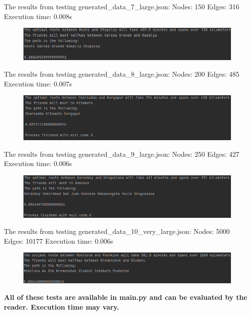 \documentclass[12pt]{article}
\begin{document}
The results from testing generated\_data\_7\_large.json:
\newline
Nodes: 150
\newline
Edges: 316
\newline
Execution time: 0.008s
\begin{figure}[htp]
    \centering
    \includegraphics[width=1\textwidth]{large1.png}
\end{figure}
\newline
The results from testing generated\_data\_8\_large.json:
\newline
Nodes: 200
\newline
Edges: 485
\newline
Execution time: 0.007s
\begin{figure}[htp]
    \centering
    \includegraphics[width=1\textwidth]{large2.png}
\end{figure}
\newline
The results from testing generated\_data\_9\_large.json:
\newline
Nodes: 250
\newline
Edges: 427
\newline
Execution time: 0.006s
\begin{figure}[htp]
    \centering
    \includegraphics[width=1\textwidth]{large3.png}
\end{figure}
\newline
The results from testing generated\_data\_10\_very\_large.json:
\newline
Nodes: 5000
\newline
Edges: 10177
\newline
Execution time: 0.006s
\begin{figure}[htp]
    \centering
    \includegraphics[width=1\textwidth]{very_large.png}
\end{figure}
\newline\newline
\textbf{All of these tests are available in main.py and can be evaluated by the reader. Execution time may vary.}
\end{document}
